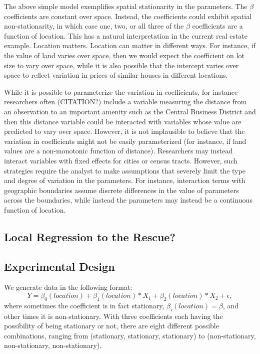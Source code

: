\documentclass{article}\usepackage[]{graphicx}\usepackage[]{color}
\begin{document}
The above simple model exemplifies spatial stationarity in the parameters. The $\beta$ coefficients are constant over space. Instead, the coefficients could exhibit spatial non-stationarity, in which case one, two, or all three of the $\beta$ coefficients are a function of location. This has a natural interpretation in the current real estate example. Location matters. Location can matter in different ways. For instance, if the value of land varies over space, then we would expect the coefficient on lot size to vary over space, while it is also possible that the intercept varies over space to reflect variation in prices of similar houses in different locations. 

While it is possible to parameterize the variation in coefficients, for instance researchers often (CITATION?) include a variable measuring the distance from an observation to an important amenity such as the Central Business District and then this distance variable could be interacted with variables whose value are predicted to vary over space. However, it is not implausible to believe that the variation in coefficients might not be easily parameterized (for instance, if land values are a non-monotonic function of distance). Researchers may instead interact variables with fixed effects for cities or census tracts. However, such strategies require the analyst to make assumptions that severely limit the type and degree of variation in the parameters. For instance, interaction terms with geographic boundaries assume discrete differences in the value of parameters across the boundaries, while instead the parameters may instead be a continuous function of location.

\subsection{Local Regression to the Rescue?}


\subsection{Experimental Design}

We generate data in the following format:
\begin{equation}
Y = \beta _0(location) + \beta _1(location) *X_1 + \beta _2(location) * X_2 + \epsilon ,
\end{equation}
where sometimes the coefficient is in fact stationary, $\beta _i(location) = \beta$, and other times it is non-stationary. With three coefficients each having the possibility of being stationary or not, there are eight different possible combinations, ranging from (stationary, stationary, stationary) to (non-stationary, non-stationary, non-stationary).
\end{document}

